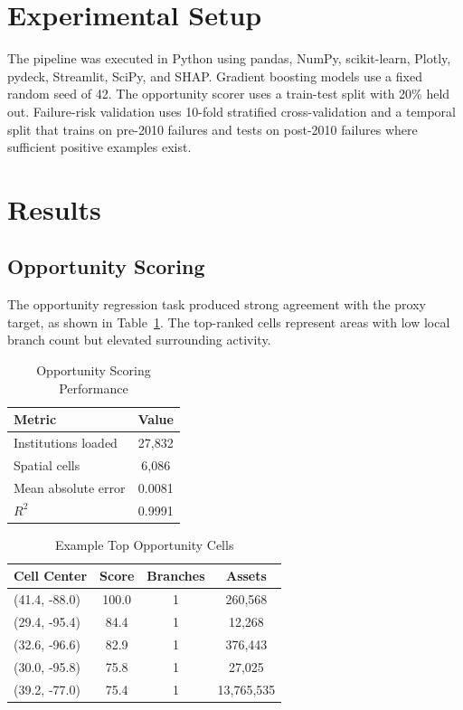 \documentclass[conference]{IEEEtran}
\begin{document}
\section{Experimental Setup}
The pipeline was executed in Python using pandas, NumPy, scikit-learn,
Plotly, pydeck, Streamlit, SciPy, and SHAP. Gradient boosting models use a
fixed random seed of 42. The opportunity scorer uses a train-test split with
20\% held out. Failure-risk validation uses 10-fold stratified
cross-validation and a temporal split that trains on pre-2010 failures and
tests on post-2010 failures where sufficient positive examples exist.

\section{Results}
\subsection{Opportunity Scoring}
The opportunity regression task produced strong agreement with the proxy
target, as shown in Table~\ref{tab:opportunity_metrics}. The top-ranked
cells represent areas with low local branch count but elevated surrounding
activity.

\begin{table}[htbp]
\caption{Opportunity Scoring Performance}
\begin{center}
\begin{tabular}{lc}
\toprule
\textbf{Metric} & \textbf{Value}\\
\midrule
Institutions loaded & 27,832\\
Spatial cells & 6,086\\
Mean absolute error & 0.0081\\
$R^2$ & 0.9991\\
\bottomrule
\end{tabular}
\label{tab:opportunity_metrics}
\end{center}
\end{table}

\begin{table}[htbp]
\caption{Example Top Opportunity Cells}
\begin{center}
\begin{tabular}{lccc}
\toprule
\textbf{Cell Center} & \textbf{Score} & \textbf{Branches} & \textbf{Assets}\\
\midrule
(41.4, -88.0) & 100.0 & 1 & 260,568\\
(29.4, -95.4) & 84.4 & 1 & 12,268\\
(32.6, -96.6) & 82.9 & 1 & 376,443\\
(30.0, -95.8) & 75.8 & 1 & 27,025\\
(39.2, -77.0) & 75.4 & 1 & 13,765,535\\
\bottomrule
\end{tabular}
\label{tab:top_opportunities}
\end{center}
\end{table}
\end{document}
